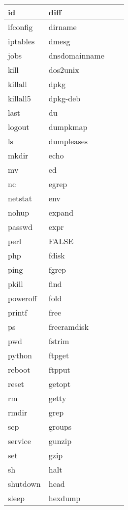 \begin{longtable}{llp{120mm}p{120mm}}
     \hline
     id & diff \\
     \hline
     ifconfig & dirname \\
     \hline
     iptables & dmesg \\
     \hline
     jobs & dnsdomainname \\
     \hline
     kill & dos2unix \\
     \hline
     killall & dpkg \\
     \hline
     killall5 & dpkg-deb \\
     \hline
     last & du \\
     \hline
     logout & dumpkmap \\
     \hline
     ls & dumpleases \\
     \hline
     mkdir & echo \\
     \hline
     mv & ed \\
     \hline
     nc & egrep \\
     \hline
     netstat & env \\
     \hline
     nohup & expand \\
     \hline
     passwd & expr \\
     \hline
     perl & FALSE \\
     \hline
     php & fdisk \\
     \hline
     ping & fgrep \\
     \hline
     pkill & find \\
     \hline
     poweroff & fold \\
     \hline
     printf & free \\
     \hline
     ps & freeramdisk \\
     \hline
     pwd & fstrim \\
     \hline
     python & ftpget \\
     \hline
     reboot & ftpput \\
     \hline
     reset & getopt \\
     \hline
     rm & getty \\
     \hline
     rmdir & grep \\
     \hline
     scp & groups \\
     \hline
     service & gunzip \\
     \hline
     set & gzip \\
     \hline
     sh & halt \\
     \hline
     shutdown & head \\
     \hline
     sleep & hexdump \\

\end{longtable}

